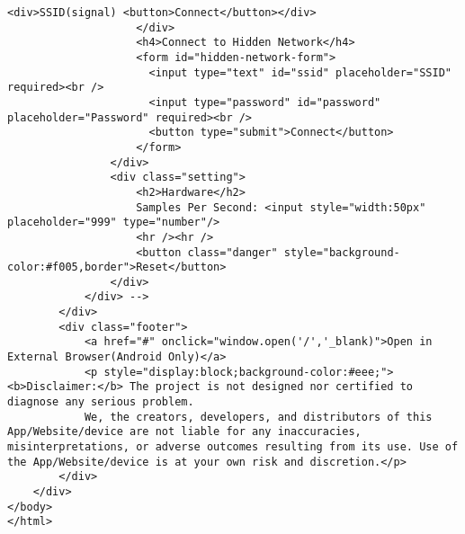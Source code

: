 \begin{lstlisting}[style=htmlcssjs]
                        <div>SSID(signal) <button>Connect</button></div>
                    </div>
                    <h4>Connect to Hidden Network</h4>
                    <form id="hidden-network-form">
                      <input type="text" id="ssid" placeholder="SSID" required><br />
                      <input type="password" id="password" placeholder="Password" required><br />
                      <button type="submit">Connect</button>
                    </form>
                </div>
                <div class="setting">
                    <h2>Hardware</h2>
                    Samples Per Second: <input style="width:50px" placeholder="999" type="number"/>
                    <hr /><hr />
                    <button class="danger" style="background-color:#f005,border">Reset</button>
                </div>
            </div> -->
        </div>
        <div class="footer">
            <a href="#" onclick="window.open('/','_blank)">Open in External Browser(Android Only)</a>
            <p style="display:block;background-color:#eee;"><b>Disclaimer:</b> The project is not designed nor certified to diagnose any serious problem.
            We, the creators, developers, and distributors of this App/Website/device are not liable for any inaccuracies, misinterpretations, or adverse outcomes resulting from its use. Use of the App/Website/device is at your own risk and discretion.</p>
        </div>
    </div>
</body>
</html>
\end{lstlisting}





